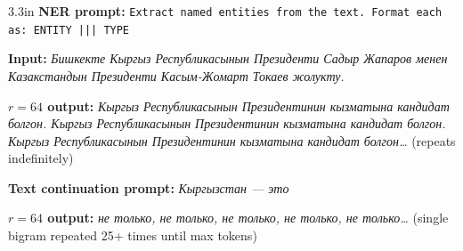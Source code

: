 \documentclass[border=2pt]{standalone}
\begin{document}
\fontsize{8.5}{10.5}\selectfont
\begin{varwidth}{3.3in}
\noindent\textbf{NER prompt:} \texttt{Extract named entities from the text. Format each as: ENTITY ||| TYPE}\par\smallskip
\noindent\textbf{Input:} {\cyrfont\itshape Бишкекте Кыргыз Республикасынын Президенти Садыр Жапаров менен Казакстандын Президенти Касым-Жомарт Токаев жолукту.}\par\smallskip
\noindent\textbf{\boldmath$r{=}64$ output:} {\cyrfont\itshape Кыргыз Республикасынын Президентинин кызматына кандидат болгон. Кыргыз Республикасынын Президентинин кызматына кандидат болгон. Кыргыз Республикасынын Президентинин кызматына кандидат болгон\ldots} (repeats indefinitely)\par\smallskip
\noindent\textbf{Text continuation prompt:} {\cyrfont\itshape Кыргызстан --- это}\par\smallskip
\noindent\textbf{\boldmath$r{=}64$ output:} {\cyrfont\itshape не только, не только, не только, не только, не только\ldots} (single bigram repeated 25+ times until max tokens)
\end{varwidth}
\end{document}
